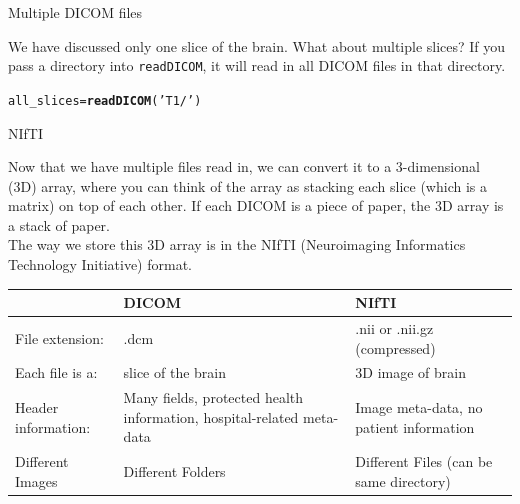 \documentclass[11pt]{beamer}\usepackage[]{graphicx}\usepackage[]{color}
\makeatletter
\newcommand{\hlstr}[1]{\textcolor[rgb]{0.192,0.494,0.8}{#1}}%
\newcommand{\hlstd}[1]{\textcolor[rgb]{0.345,0.345,0.345}{#1}}%
\newcommand{\hlkwb}[1]{\textcolor[rgb]{0.69,0.353,0.396}{#1}}%
\newcommand{\hlkwd}[1]{\textcolor[rgb]{0.737,0.353,0.396}{\textbf{#1}}}%
\newenvironment{kframe}{%
 \def\at@end@of@kframe{}%
 \ifinner\ifhmode%
  \def\at@end@of@kframe{\end{minipage}}%
  \begin{minipage}{\columnwidth}%
 \fi\fi%
 \def\FrameCommand##1{\hskip\@totalleftmargin \hskip-\fboxsep
 \colorbox{shadecolor}{##1}\hskip-\fboxsep
     \hskip-\linewidth \hskip-\@totalleftmargin \hskip\columnwidth}%
 \MakeFramed {\advance\hsize-\width
   \@totalleftmargin\z@ \linewidth\hsize
   \@setminipage}}%
 {\par\unskip\endMakeFramed%
 \at@end@of@kframe}
\newenvironment{knitrout}{}{} %
\makeatother
\begin{document}
\begin{frame}[fragile]{Multiple DICOM files}

We have discussed only one slice of the brain.  What about multiple slices?  If you pass a directory into \verb|readDICOM|, it will read in all DICOM files in that directory.

\begin{knitrout}
\color{fgcolor}\begin{kframe}
\begin{alltt}
\hlstd{all_slices} \hlkwb{=} \hlkwd{readDICOM}\hlstd{(}\hlstr{'T1/'}\hlstd{)}
\end{alltt}
\end{kframe}
\end{knitrout}


\end{frame}



\begin{frame}[fragile]{NIfTI}

Now that we have multiple files read in, we can convert it to a 3-dimensional (3D) array, where you can think of the array as stacking each slice (which is a matrix) on top of each other.  If each DICOM is a piece of paper, the 3D array is a stack of paper.\\

The way we store this 3D array is in the NIfTI (Neuroimaging Informatics Technology Initiative) format.  \\

\begin{table}[h]
\begin{tabular}{m{}|m{}|m{}}
& DICOM & NIfTI \\ \hline
File extension: & .dcm & .nii or .nii.gz (compressed) \\
Each file is a: & slice of the brain & 3D image of brain \\
Header information: & Many fields, protected health information, hospital-related meta-data & Image meta-data, no patient information \\
Different Images & Different Folders & Different Files (can be same directory)
\end{tabular}
\end{table}
\end{frame}
\end{document}
